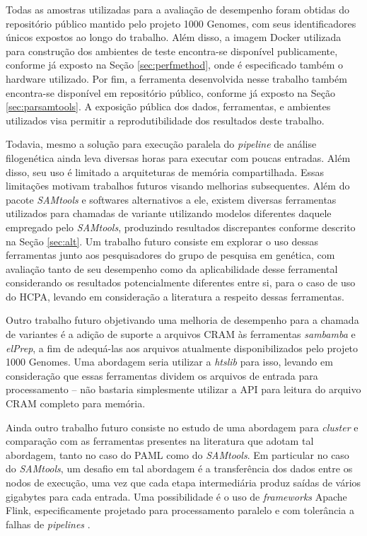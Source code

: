 \documentclass[cic,tc]{iiufrgs}
\begin{document}
Todas as amostras utilizadas para a avaliação de desempenho foram obtidas do
repositório público mantido pelo projeto 1000 Genomes, com seus identificadores
únicos expostos ao longo do trabalho. Além disso, a imagem Docker utilizada
para construção dos ambientes de teste encontra-se disponível publicamente,
conforme já exposto na Seção \ref{sec:perfmethod}, onde é especificado também o
hardware utilizado. Por fim, a ferramenta desenvolvida nesse trabalho também
encontra-se disponível em repositório público, conforme já exposto na Seção
\ref{sec:parsamtools}. A exposição pública dos dados, ferramentas, e ambientes
utilizados visa permitir a reprodutibilidade dos resultados deste trabalho.

Todavia, mesmo a solução para execução paralela do \textit{pipeline} de análise
filogenética ainda leva diversas horas para executar com poucas entradas. Além
disso, seu uso é limitado a arquiteturas de memória compartilhada. Essas
limitações motivam trabalhos futuros visando melhorias subsequentes. Além do
pacote \textit{SAMtools} e softwares alternativos a ele, existem diversas
ferramentas utilizados para chamadas de variante utilizando modelos diferentes
daquele empregado pelo \textit{SAMtools}, produzindo resultados discrepantes
conforme descrito na Seção \ref{sec:alt}. Um trabalho futuro consiste em
explorar o uso dessas ferramentas junto aos pesquisadores do grupo de pesquisa
em genética, com avaliação tanto de seu desempenho como da aplicabilidade desse
ferramental considerando os resultados potencialmente diferentes entre si, para
o caso de uso do HCPA, levando em consideração a literatura a respeito dessas
ferramentas.

Outro trabalho futuro objetivando uma melhoria de desempenho para a chamada de
variantes é a adição de suporte a arquivos CRAM às ferramentas
\textit{sambamba} e \textit{elPrep}, a fim de adequá-las aos arquivos
atualmente disponibilizados pelo projeto 1000 Genomes. Uma abordagem seria
utilizar a \textit{htslib} para isso, levando em consideração que essas ferramentas
dividem os arquivos de entrada para processamento -- não bastaria simplesmente
utilizar a API para leitura do arquivo CRAM completo para memória.

Ainda outro trabalho futuro consiste no estudo de uma abordagem para
\textit{cluster} e comparação com as ferramentas presentes na literatura que
adotam tal abordagem, tanto no caso do PAML como do \textit{SAMtools}. Em particular no
caso do \textit{SAMtools}, um desafio em tal abordagem é a transferência dos dados entre
os nodos de execução, uma vez que cada etapa intermediária produz saídas de
vários gigabytes para cada entrada. Uma possibilidade é o uso de
\textit{frameworks} Apache Flink, especificamente projetado para processamento
paralelo e com tolerância a falhas de \textit{pipelines} \cite{carbone2015apache}.
\end{document}
